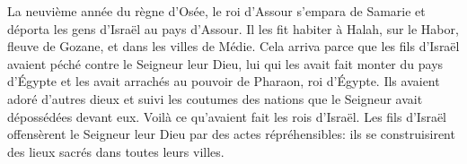 La neuvième année du règne d’Osée,
	le roi d’Assour s’empara de Samarie et déporta les gens d’Israël au pays d’Assour.
Il les fit habiter à Halah, sur le Habor, fleuve de Gozane, et dans les villes de Médie.
Cela arriva parce que les fils d’Israël avaient péché contre le Seigneur leur Dieu,
	lui qui les avait fait monter du pays d’Égypte
	et les avait arrachés au pouvoir de Pharaon, roi d’Égypte.
Ils avaient adoré d’autres dieux
	et suivi les coutumes des nations que le Seigneur avait dépossédées devant eux.
Voilà ce qu’avaient fait les rois d’Israël.
Les fils d’Israël offensèrent le Seigneur leur Dieu par des actes répréhensibles:
	ils se construisirent des lieux sacrés dans toutes leurs villes.
